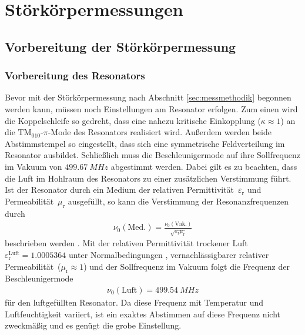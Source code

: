 \chapter{Störkörpermessungen}
\label{sec:stoerkoerpermessung}


\section{Vorbereitung der Störkörpermessung}

\subsection{Vorbereitung des Resonators}
\label{sec:vorbereitung_resonator}
Bevor mit der Störkörpermessung nach Abschnitt \ref{sec:messmethodik} begonnen werden kann, müssen noch Einstellungen am Resonator erfolgen.
Zum einen wird die Koppelschleife so gedreht, dass eine nahezu kritische Einkopplung ($\kappa \approx 1$) an die $\mathrm{TM}_{010}\text{-}\pi$-Mode des Resonators realisiert wird.
Außerdem werden beide Abstimmstempel so eingestellt, dass sich eine symmetrische Feldverteilung im Resonator ausbildet.
Schließlich muss die Beschleunigermode auf ihre Sollfrequenz im Vakuum von $\SI{499.67}{MHz}$ abgestimmt werden.
Dabei gilt es zu beachten, dass die Luft im Hohlraum des Resonators zu einer zusätzlichen Verstimmung führt.
Ist der Resonator durch ein Medium der relativen Permittivität~$\varepsilon_\mathrm{r}$ und Permeabilität~$\mu_\mathrm{r}$ ausgefüllt, so kann die Verstimmung der Resonanzfrequenzen durch
\begin{align}
	\nu_0(\mathrm{Med.}) = \frac{\nu_0(\mathrm{Vak.})}{\sqrt{\varepsilon_\mathrm{r} \mu_\mathrm{r}}}
	\label{eq:resonanzfrequenz_medium}
\end{align}
beschrieben werden \cite{pusch}.
Mit der relativen Permittivität trockener Luft~$\varepsilon_\mathrm{r}^\mathrm{Luft} = \num{1.0005364}$ unter Normalbedingungen \cite[S.\ 1093]{CRC}, vernachlässigbarer relativer Permeabilität~($\mu_\mathrm{r} \approx 1$) und der Sollfrequenz im Vakuum folgt die Frequenz der Beschleunigermode
\begin{align}
	\nu_0(\mathrm{Luft}) = \SI{499.54}{MHz}
\end{align}
für den luftgefüllten Resonator.
Da diese Frequenz mit Temperatur und Luftfeuchtigkeit variiert, ist ein exaktes Abstimmen auf diese Frequenz nicht zweckmäßig und es genügt die grobe Einstellung.

